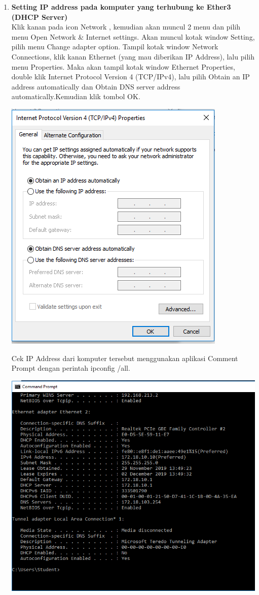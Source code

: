 \documentclass[a4paper,12pt]{article}
\begin{document}
\begin{enumerate}
	\item \textbf{Setting IP address pada komputer yang terhubung ke Ether3 (DHCP Server)}\\
	Klik kanan pada icon Network , kemudian akan muncul 2 menu dan pilih menu
Open Network \& Internet settings. Akan muncul kotak window Setting, pilih menu Change adapter option.
	Tampil kotak window Network Connections, klik kanan Ethernet (yang mau diberikan IP Address), lalu pilih menu Properties.
	Maka akan tampil kotak window Ethernet Properties, double klik Internet Protocol Version 4 (TCP/IPv4), lalu pilih Obtain an IP address automatically dan Obtain DNS server address automatically.Kemudian klik tombol OK. 
	\begin{center}
		\includegraphics[scale=.8]{image4}
	\end{center}
	Cek IP Address dari komputer tersebut menggunakan aplikasi Comment Prompt dengan perintah ipconfig /all.
	\begin{center}
		\includegraphics[scale=.4]{image5}

\end{center}
\end{enumerate}
\end{document}
